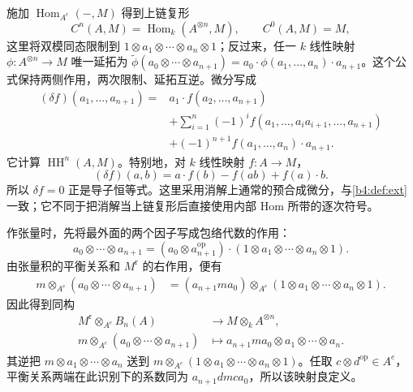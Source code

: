 施加 \(\operatorname{Hom}_{A^e}(-,M)\) 得到上链复形
\[
	C^n(A,M)=\operatorname{Hom}_k(A^{\otimes n},M),\qquad C^0(A,M)=M,
\]
这里将双模同态限制到 \(1\otimes a_1\otimes\cdots\otimes a_n\otimes1\)；反过来，任一 \(k\) 线性映射 \(\phi:A^{\otimes n}\to M\) 唯一延拓为 \(\widetilde\phi(a_0\otimes\cdots\otimes a_{n+1})=a_0\cdot\phi(a_1,\ldots,a_n)\cdot a_{n+1}\)。这个公式保持两侧作用，两次限制、延拓互逆。微分写成
\begin{equation}\label{b4:eq:hochschild-coboundary}
	\begin{aligned}
		(\delta f)(a_1,\ldots,a_{n+1}) ={}&a_1\cdot f(a_2,\ldots,a_{n+1})\\
		&+\sum_{i=1}^{n}(-1)^i f(a_1,\ldots,a_i a_{i+1},\ldots,a_{n+1})\\
		&+(-1)^{n+1}f(a_1,\ldots,a_n)\cdot a_{n+1}.
	\end{aligned}
\end{equation}
它计算 \(\operatorname{HH}^n(A,M)\)。特别地，对 \(k\) 线性映射 \(f:A\to M\)，
\[
	(\delta f)(a,b)=a\cdot f(b)-f(ab)+f(a)\cdot b.
\]
所以 \(\delta f=0\) 正是导子恒等式。这里采用消解上通常的预合成微分，与\cref{b4:def:ext}一致；它不同于把消解当上链复形后直接使用内部 Hom 所带的逐次符号。

\ProseParagraphBreak
作张量时，先将最外面的两个因子写成包络代数的作用：
\[
	a_0\otimes\cdots\otimes a_{n+1} =(a_0\otimes a_{n+1}^{\mathrm{op}}) \cdot(1\otimes a_1\otimes\cdots\otimes a_n\otimes1).
\]
由张量积的平衡关系和 \(M^{\mathrm r}\) 的右作用，便有
\[
	\begin{aligned}
		m\otimes_{A^e}(a_0\otimes\cdots\otimes a_{n+1}) &=(a_{n+1}ma_0)\otimes_{A^e} (1\otimes a_1\otimes\cdots\otimes a_n\otimes1).
	\end{aligned}
\]
因此得到同构
\[
	\begin{aligned}
		M^{\mathrm r}\otimes_{A^e}B_n(A)&\longrightarrow M\otimes_k A^{\otimes n},\\
		m\otimes_{A^e}(a_0\otimes\cdots\otimes a_{n+1}) &\longmapsto a_{n+1}ma_0\otimes a_1\otimes\cdots\otimes a_n.
	\end{aligned}
\]
其逆把 \(m\otimes a_1\otimes\cdots\otimes a_n\) 送到 \(m\otimes_{A^e}(1\otimes a_1\otimes\cdots\otimes a_n\otimes1)\)。任取 \(c\otimes d^{\mathrm{op}}\in A^e\)，平衡关系两端在此识别下的系数同为 \(a_{n+1}dmca_0\)，所以该映射良定义。


